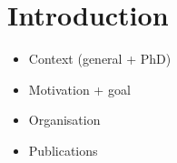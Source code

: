 \documentclass[a4paper,11pt,twoside]{StyleThese}
\begin{document}
\fi


\chapter*{Introduction}
\begin{itemize}
\item Context (general + PhD)
\item Motivation + goal
\item Organisation
\item Publications
\end{itemize}

\ifdefined{}
\else


\end{document}
